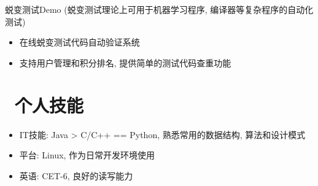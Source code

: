 \documentclass{resume}
\begin{document}
蜕变测试Demo (蜕变测试理论上可用于机器学习程序, 编译器等复杂程序的自动化测试)
\begin{itemize}
  \item 在线蜕变测试代码自动验证系统
  \item 支持用户管理和积分排名, 提供简单的测试代码查重功能
\end{itemize}

\section{\faCogs\ 个人技能}
\begin{itemize}[parsep=0.5ex]
  \item IT技能: Java > C/C++ == Python, 熟悉常用的数据结构, 算法和设计模式
  \item 平台: Linux, 作为日常开发环境使用
  \item 英语: CET-6, 良好的读写能力
\end{itemize}

% 


\end{document}
